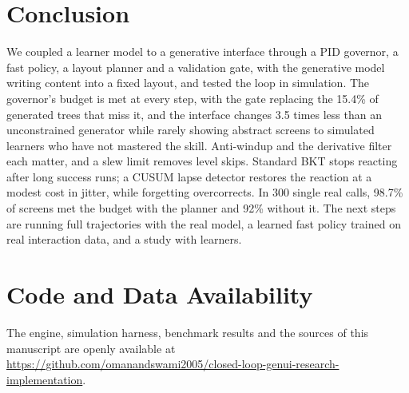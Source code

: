 \documentclass[conference]{IEEEtran}
\begin{document}
\section{Conclusion}
We coupled a learner model to a generative interface through a PID
governor, a fast policy, a layout planner and a validation gate, with the
generative model writing content into a fixed layout, and tested the loop
in simulation. The governor's budget is met at every step, with the gate
replacing the 15.4\% of generated trees that miss it, and the interface changes 3.5 times less than an
unconstrained generator while rarely showing abstract screens to simulated
learners who have not mastered the skill. Anti-windup and the derivative filter each
matter, and a slew limit removes level skips. Standard BKT stops reacting
after long success runs; a CUSUM lapse detector restores the reaction at
a modest cost in jitter, while forgetting overcorrects. In 300 single real calls, 98.7\% of
screens met the budget with the planner and 92\% without it. The next steps are
running full trajectories with the real model, a learned fast policy
trained on real interaction data, and a study with learners.

\section*{Code and Data Availability}
The engine, simulation harness, benchmark results and the sources of
this manuscript are openly available at \url{https://github.com/omanandswami2005/closed-loop-genui-research-implementation}.



\end{document}
